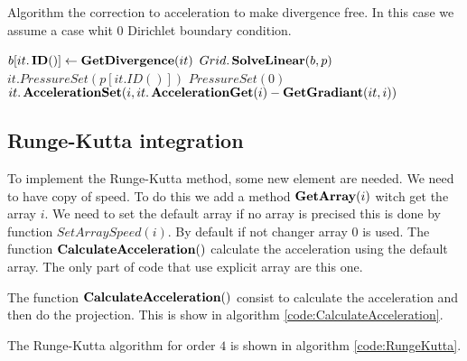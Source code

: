 \begin{algorithm}
\caption{Algorithm the correction to acceleration to make divergence free.
In this case we assume a case whit 0 Dirichlet boundary condition.}
\label{code:ProjectAcceleration}
\begin{algorithmic}[1]
				\State $b[it.\mathop{\textbf{ID}}()] \gets \mathop{\textbf{GetDivergence}}(it)$
			\EndIf
		\EndFor
		\State $Grid.\mathop{\textbf{SolveLinear}}(b,p)$
				\State $it.PressureSet(p[it.ID()])$
			\ElsIf
				\State $PressureSet(0)$
			\EndIf
		\EndFor
				\State $it.\mathop{\textbf{AccelerationSet}}(i,it.\mathop{\textbf{AccelerationGet}}(i)-\mathop{\textbf{GetGradiant}}(it,i))$
			\EndFor
		\EndFor
\EndProcedure
			 \end{algorithmic}
\end{algorithm}

\subsection{Runge-Kutta integration}

To implement the Runge-Kutta method, some new element are needed.
We need to have copy of speed. To do this we add a method $\mathop{\textbf{GetArray}}(i)$ witch get the array $i$.
We need to set the default array if no array is precised this is done by function $SetArraySpeed(i)$.
By default if not changer array $0$ is used.
The function $\mathop{\textbf{CalculateAcceleration}}()$ calculate the acceleration using the default array.
The only part of code that use explicit array are this one.

The function $\mathop{\textbf{CalculateAcceleration}}()$ consist to calculate the acceleration and then do the projection.
This is show in algorithm \ref{code:CalculateAcceleration}.

The Runge-Kutta algorithm for order $4$ is shown in algorithm \ref{code:RungeKutta}.


